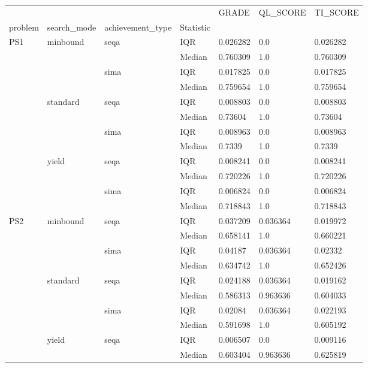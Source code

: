 \begin{tabular}{lllllll}
\toprule
    &       &      &        &     GRADE &  QL\_SCORE &  TI\_SCORE \\
problem & search\_mode & achievement\_type & Statistic &           &           &           \\
\midrule
PS1 & minbound & seqa & IQR &  0.026282 &       0.0 &  0.026282 \\
    &       &      & Median &  0.760309 &       1.0 &  0.760309 \\
    &       & sima & IQR &  0.017825 &       0.0 &  0.017825 \\
    &       &      & Median &  0.759654 &       1.0 &  0.759654 \\
    & standard & seqa & IQR &  0.008803 &       0.0 &  0.008803 \\
    &       &      & Median &   0.73604 &       1.0 &   0.73604 \\
    &       & sima & IQR &  0.008963 &       0.0 &  0.008963 \\
    &       &      & Median &    0.7339 &       1.0 &    0.7339 \\
    & yield & seqa & IQR &  0.008241 &       0.0 &  0.008241 \\
    &       &      & Median &  0.720226 &       1.0 &  0.720226 \\
    &       & sima & IQR &  0.006824 &       0.0 &  0.006824 \\
    &       &      & Median &  0.718843 &       1.0 &  0.718843 \\
PS2 & minbound & seqa & IQR &  0.037209 &  0.036364 &  0.019972 \\
    &       &      & Median &  0.658141 &       1.0 &  0.660221 \\
    &       & sima & IQR &   0.04187 &  0.036364 &   0.02332 \\
    &       &      & Median &  0.634742 &       1.0 &  0.652426 \\
    & standard & seqa & IQR &  0.024188 &  0.036364 &  0.019162 \\
    &       &      & Median &  0.586313 &  0.963636 &  0.604033 \\
    &       & sima & IQR &   0.02084 &  0.036364 &  0.022193 \\
    &       &      & Median &  0.591698 &       1.0 &  0.605192 \\
    & yield & seqa & IQR &  0.006507 &       0.0 &  0.009116 \\
    &       &      & Median &  0.603404 &  0.963636 &  0.625819 \\

\end{tabular}
